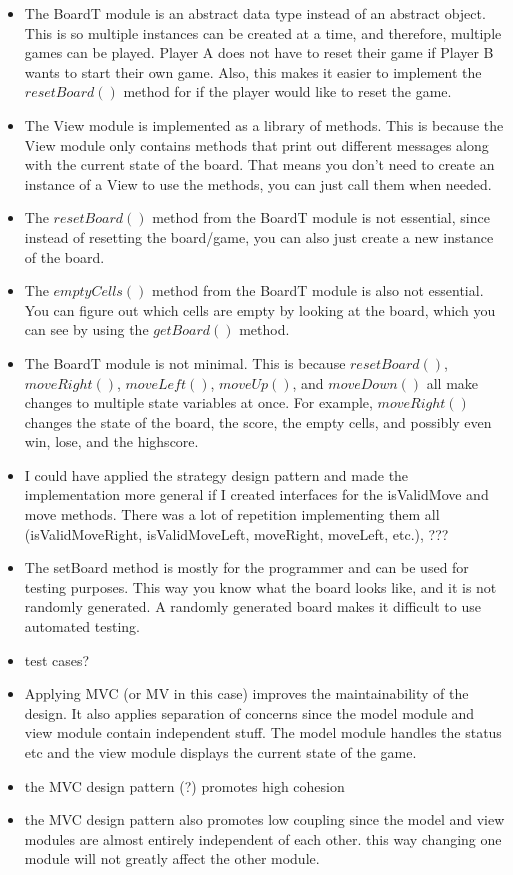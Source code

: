 \documentclass[12pt]{article}
\begin{document}
\begin{itemize}
  \item The BoardT module is an abstract data type instead of an abstract object. This is so multiple instances can be created at a time, and therefore, multiple games can be played. Player A does not have to reset their game if Player B wants to start their own game. Also, this makes it easier to implement the $resetBoard()$ method for if the player would like to reset the game.
  \item The View module is implemented as a library of methods. This is because the View module only contains methods that print out different messages along with the current state of the board. That means you don't need to create an instance of a View to use the methods, you can just call them when needed.
  \item The $resetBoard()$ method from the BoardT module is not essential, since instead of resetting the board/game, you can also just create a new instance of the board.
  \item The $emptyCells()$ method from the BoardT module is also not essential. You can figure out which cells are empty by looking at the board, which you can see by using the $getBoard()$ method.
  \item The BoardT module is not minimal. This is because $resetBoard()$, $moveRight()$, $moveLeft()$, $moveUp()$, and $moveDown()$ all make changes to multiple state variables at once. For example, $moveRight()$ changes the state of the board, the score, the empty cells, and possibly even win, lose, and the highscore.
  \item I could have applied the strategy design pattern and made the implementation more general if I created interfaces for the isValidMove and move methods. There was a lot of repetition implementing them all (isValidMoveRight, isValidMoveLeft, moveRight, moveLeft, etc.), ???
  \item The setBoard method is mostly for the programmer and can be used for testing purposes. This way you know what the board looks like, and it is not randomly generated. A randomly generated board makes it difficult to use automated testing.
  \item test cases?
  \item Applying MVC (or MV in this case) improves the maintainability of the design. It also applies separation of concerns since the model module and view module contain independent stuff. The model module handles the status etc and the view module displays the current state of the game.
  \item the MVC design pattern (?) promotes high cohesion 
  \item the MVC design pattern also promotes low coupling since the model and view modules are almost entirely independent of each other. this way changing one module will not greatly affect the other module.
  
\end{itemize}
\end{document}
